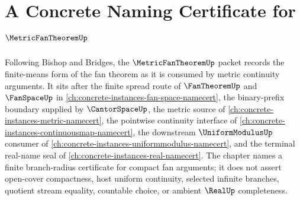 \chapter{A Concrete Naming Certificate for $\MetricFanTheoremUp$}
\label{ch:concrete-instances-metric-fan-theorem-namecert}

Following Bishop and Bridges, the $\MetricFanTheoremUp$ packet records the finite-means form of the fan theorem as it is consumed by metric continuity arguments. It sits after the finite spread route of $\FanTheoremUp$ and $\FanSpaceUp$ in \autoref{ch:concrete-instances-fan-space-namecert}, the binary-prefix boundary supplied by $\CantorSpaceUp$, the metric source of \autoref{ch:concrete-instances-metric-namecert}, the pointwise continuity interface of \autoref{ch:concrete-instances-continuousmap-namecert}, the downstream $\UniformModulusUp$ consumer of \autoref{ch:concrete-instances-uniformmodulus-namecert}, and the terminal real-name seal of \autoref{ch:concrete-instances-real-namecert}. The chapter names a finite branch-radius certificate for compact fan arguments; it does not assert open-cover compactness, host uniform continuity, selected infinite branches, quotient stream equality, countable choice, or ambient $\RealUp$ completeness.

